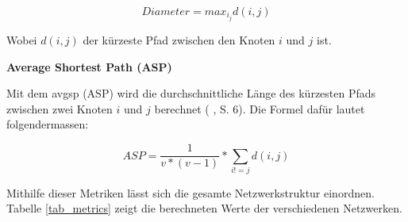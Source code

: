 \begin{equation}
    \label{eq:diameter}
    Diameter = max_i_jd(i,j)
\end{equation}

Wobei $d(i,j)$ der kürzeste Pfad zwischen den Knoten $i$ und $j$ ist.

\textbf{Average Shortest Path (ASP)}

Mit dem \acs{avgsp} (ASP) wird die durchschnittliche Länge des kürzesten Pfads zwischen zwei Knoten $i$ und $j$ berechnet (\citeauthor{gao_link_2015} \citeyear{gao_link_2015}, S. 6).
Die Formel dafür lautet folgendermassen:

\begin{equation}
    \label{eq:asp}
    ASP = \frac{1}{v * (v - 1)} * \sum\limits_{i!=j} d(i,j)
\end{equation}

Mithilfe dieser Metriken lässt sich die gesamte Netzwerkstruktur einordnen.
Tabelle \ref{tab_metrics} zeigt die berechneten Werte der verschiedenen Netzwerken.

\begin{table}[h]
    \centering
    \caption{Metrikwerte der Netzwerke}
    \label{tab_metrics}
\end{table}
